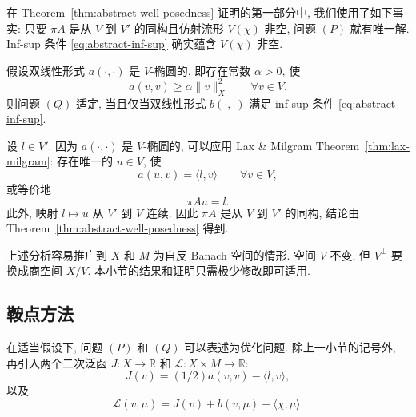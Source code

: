 \setcounter{statement}{0}
\begin{Remark}\label{rem:abstract-problem-p-solvability}
在 Theorem~\ref{thm:abstract-well-posedness} 证明的第一部分中,
我们使用了如下事实: 只要 $\pi A$ 是从 $V$ 到 $V'$ 的同构且仿射流形
$V(\chi)$ 非空, 问题 $(P)$ 就有唯一解. Inf-sup 条件
\eqref{eq:abstract-inf-sup} 确实蕴含 $V(\chi)$ 非空.
\end{Remark}

\setcounter{statement}{0}
\begin{Corollary}\label{cor:abstract-v-elliptic-well-posedness}
假设双线性形式 $a(\cdot,\cdot)$ 是 $V$-椭圆的, 即存在常数 $\alpha>0$, 使
\begin{equation}\label{eq:abstract-v-ellipticity}
a(v,v)\ge\alpha\|v\|_X^2
\qquad\forall v\in V.
\end{equation}
则问题 $(Q)$ 适定, 当且仅当双线性形式 $b(\cdot,\cdot)$ 满足 inf-sup 条件
\eqref{eq:abstract-inf-sup}.
\end{Corollary}
\begin{Proof}
设 $l\in V'$. 因为 $a(\cdot,\cdot)$ 是 $V$-椭圆的,
可以应用 Lax \& Milgram Theorem~\ref{thm:lax-milgram}:
存在唯一的 $u\in V$, 使
\[
a(u,v)=\langle l,v\rangle
\qquad\forall v\in V,
\]
或等价地
\[
\pi Au=l.
\]
此外, 映射 $l\mapsto u$ 从 $V'$ 到 $V$ 连续. 因此 $\pi A$ 是从
$V$ 到 $V'$ 的同构, 结论由 Theorem~\ref{thm:abstract-well-posedness} 得到.
\end{Proof}

\setcounter{statement}{1}
\begin{Remark}\label{rem:abstract-reflexive-banach-extension}
上述分析容易推广到 $X$ 和 $M$ 为自反 Banach 空间的情形.
空间 $V$ 不变, 但 $V^\perp$ 要换成商空间 $X/V$.
本小节的结果和证明只需极少修改即可适用.
\end{Remark}

\setcounter{subsection}{1}
\subsection{鞍点方法}\label{subsec:abstract-saddle-point}

在适当假设下, 问题 $(P)$ 和 $(Q)$ 可以表述为优化问题.
除上一小节的记号外, 再引入两个二次泛函
$J:X\to\mathbb R$ 和 $\mathcal L:X\times M\to\mathbb R$:
\begin{equation}\label{eq:abstract-functional-j}
J(v)=(1/2)a(v,v)-\langle l,v\rangle,
\end{equation}
以及
\begin{equation}\label{eq:abstract-lagrangian}
\mathcal L(v,\mu)=J(v)+b(v,\mu)-\langle\chi,\mu\rangle.
\end{equation}
